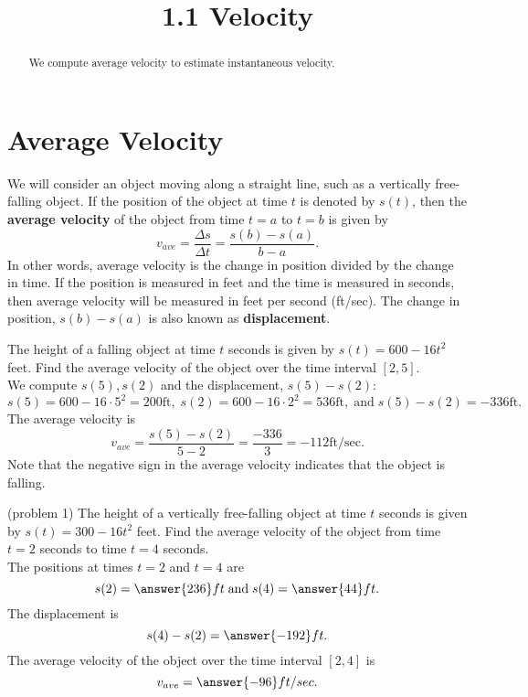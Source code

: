 \documentclass[handout]{ximera}
\title{1.1 Velocity}
\begin{document}
\begin{abstract}
We compute average velocity to estimate instantaneous velocity.
\end{abstract}

\maketitle

\section{Average Velocity}
We will consider an object moving along a straight line, such as a vertically free-falling object. If the position of the object at time $t$
is denoted by $s(t)$, then the \textbf{average velocity} of the object from time $t = a$ to $t = b$ is given by 
\[
v_{ave} = \frac{\Delta s}{\Delta t} = \frac{s(b) - s(a)}{b-a}.
\]
In other words, average velocity is the change in position divided by the change in time. 
If the position is measured in feet and the time is measured in seconds, then average velocity will be 
measured in feet per second (ft/sec). The change in position, $s(b) - s(a)$ is also known as \textbf{displacement}.


\begin{example}[example 1]
The height of a falling object at time $t$ seconds is given by $s(t) = 600-16t^2$ feet.
Find the average velocity of the object over the time interval $[2, 5]$.\\
We compute $s(5), s(2)$ and the displacement, $s(5) - s(2)$:
\[
s(5) = 600 - 16\cdot 5^2 = 200 \text{ft}, \; s(2) = 600 - 16 \cdot 2^2 = 536 \text{ft}, \; \text {and} \; s(5) - s(2) = -336 \text{ft}.
\]
The average velocity is
\[
v_{ave} = \frac{s(5) - s(2)}{5-2} = \frac{-336}{3} = - 112 \text{ft/sec}.
\]
Note that the negative sign in the average velocity indicates that the object is 
falling.
\end{example}



\begin{problem}(problem 1)
The height of a vertically free-falling object at time $t$ seconds is given by $s(t) = 300 - 16t^2$ feet.
Find the average velocity of the object from time $t = 2$ seconds to time $t = 4$ seconds.\\
The positions at times $t = 2$ and $t= 4$ are
\[
s(2) = \answer{236}ft \; \text{and} \; s(4) = \answer{44}ft.
\]
The displacement is 
\[
s(4) - s(2) = \answer{-192}ft.
\]
The average velocity of the object over the time interval $[2,4]$ is 
\[
v_{ave} = \answer{-96}ft/sec.
\]

\end{problem}
\end{document}
